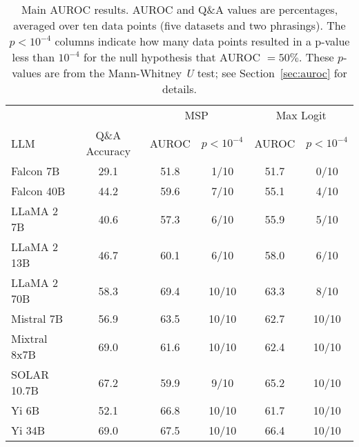 \begin{table*}
\small
\centering
\caption{Main AUROC results. AUROC and Q\&A values are percentages, averaged over ten data points (five datasets and two phrasings). The $p < 10^{-4}$ columns indicate how many data points resulted in a p-value less than $10^{-4}$ for the null hypothesis that AUROC $= 50\%$. These $p$-values are from the Mann-Whitney \emph{U} test; see Section~\ref{sec:auroc} for details.}
\label{tab:auroc}
\begin{tabular}{lccccc}
\toprule
& & \multicolumn{2}{c}{MSP} & \multicolumn{2}{c}{Max Logit} \\ 
LLM & Q\&A Accuracy & AUROC & $p < 10^{-4}$ & AUROC & $p < 10^{-4}$\\ 
\cmidrule(lr){1-1} \cmidrule(lr){2-2} \cmidrule(lr){3-4} \cmidrule(lr){5-6}
Falcon 7B & 29.1 & 51.8 & 1/10 & 51.7 & 0/10 \\
Falcon 40B & 44.2 & 59.6 & 7/10 & 55.1 & 4/10 \\
LLaMA 2 7B & 40.6 & 57.3 & 6/10 & 55.9 & 5/10 \\
LLaMA 2 13B & 46.7 & 60.1 & 6/10 & 58.0 & 6/10 \\
LLaMA 2 70B & 58.3 & 69.4 & 10/10 & 63.3 & 8/10 \\
Mistral 7B & 56.9 & 63.5 & 10/10 & 62.7 & 10/10 \\
Mixtral 8x7B & 69.0 & 61.6 & 10/10 & 62.4 & 10/10 \\
SOLAR 10.7B & 67.2 & 59.9 & 9/10 & 65.2 & 10/10 \\
Yi 6B & 52.1 & 66.8 & 10/10 & 61.7 & 10/10 \\
Yi 34B & 69.0 & 67.5 & 10/10 & 66.4 & 10/10 \\
\bottomrule
\end{tabular}
\end{table*}